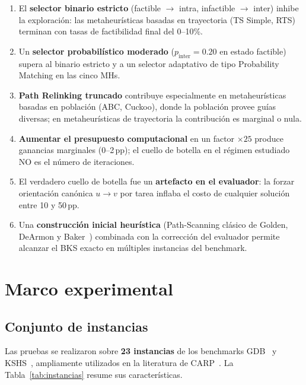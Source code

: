 \documentclass[11pt,a4paper]{article}
\theoremstyle{definition}
\theoremstyle{remark}
\begin{document}
\begin{enumerate}
\item El \textbf{selector binario estricto} (factible $\to$ intra,
  infactible $\to$ inter) inhibe la exploración: las metaheurísticas
  basadas en trayectoria (TS Simple, RTS) terminan con tasas de
  factibilidad final del 0--10\%.
\item Un \textbf{selector probabilístico moderado} ($p_{\text{inter}}
  = 0.20$ en estado factible) supera al binario estricto y a un
  selector adaptativo de tipo Probability Matching en las cinco MHs.
\item \textbf{Path Relinking truncado} contribuye especialmente en
  metaheurísticas basadas en población (ABC, Cuckoo), donde la
  población provee guías diversas; en metaheurísticas de trayectoria
  la contribución es marginal o nula.
\item \textbf{Aumentar el presupuesto computacional} en un factor
  $\times25$ produce ganancias marginales (0--2\,pp); el cuello de
  botella en el régimen estudiado NO es el número de iteraciones.
\item El verdadero cuello de botella fue un \textbf{artefacto en el
  evaluador}: la forzar orientación canónica $u \to v$ por tarea
  inflaba el costo de cualquier solución entre 10 y 50\,pp.
\item Una \textbf{construcción inicial heurística} (Path-Scanning
  clásico de Golden, DeArmon y Baker~\cite{golden1983}) combinada con la
  corrección del evaluador permite alcanzar el BKS exacto en múltiples
  instancias del benchmark.
\end{enumerate}

\section{Marco experimental}
\label{sec:marco-experimental}

\subsection{Conjunto de instancias}
\label{sec:instancias}

Las pruebas se realizaron sobre \textbf{23 instancias} de los
benchmarks GDB~\cite{golden1983} y KSHS~\cite{kiuchi1995}, ampliamente
utilizados en la literatura de CARP~\cite{golden1981}. La
Tabla~\ref{tab:instancias} resume sus características.
\end{document}
